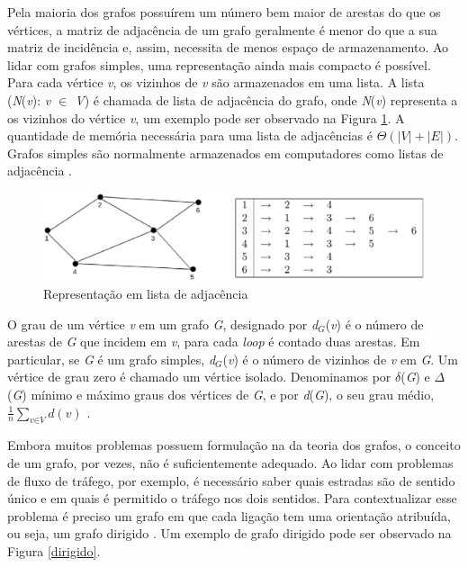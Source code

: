 Pela maioria dos grafos possuírem um número bem maior de arestas do que os vértices, a matriz de adjacência de um grafo geralmente é menor do que a sua matriz de incidência e, assim, necessita de menos espaço de armazenamento. Ao lidar com grafos simples, uma representação ainda mais compacto é possível. Para cada vértice \textit{v}, os vizinhos de \textit{v} são armazenados em uma lista. A lista (\textit{N}(\textit{v}): \textit{v $\in$ V}) é chamada de lista de adjacência do grafo, onde \textit{N}(\textit{v}) representa a os vizinhos do vértice \textit{v}, um exemplo pode ser observado na Figura \ref{lista_adjacencia}. A quantidade de memória necessária para uma lista de adjacências é $\Theta(|\textit{V}| + |\textit{E}|)$. Grafos simples são normalmente armazenados em computadores como listas de adjacência \cite{Costa:2011}.

\begin{figure}[!h]
	\centering
	\includegraphics[scale=0.5]{figuras/capitulo2/lista_adjacencia.eps}
	\caption{Representação em lista de adjacência}
	\label{lista_adjacencia}
\end{figure}

O grau de um vértice \textit{v} em um grafo \textit{G}, designado por \textit{d$_G$}(\textit{v}) é o número de arestas de \textit{G} que incidem em \textit{v}, para cada \textit{loop} é contado duas arestas. Em particular, se \textit{G} é um grafo simples, \textit{d$_G$}(\textit{v}) é o número de vizinhos de \textit{v} em \textit{G}. Um vértice de grau zero é chamado um vértice isolado. Denominamos por $\delta$(\textit{G}) e $\Delta$(\textit{G}) mínimo e máximo graus dos vértices de \textit{G}, e por \textit{d}(\textit{G}), o seu grau médio, $\frac{1}{n}\sum_{\textit{v}\in\textit{V}} \textit{d}(\textit{v})$ \cite{Diestel:1997}.

Embora muitos problemas possuem formulação na da teoria dos grafos, o conceito de um grafo, por vezes, não é suficientemente adequado. Ao lidar com problemas de fluxo de tráfego, por exemplo, é necessário saber quais estradas são de sentido único e em quais é permitido o tráfego nos dois sentidos. Para contextualizar esse problema é preciso um grafo em que cada ligação tem uma orientação atribuída, ou seja, um grafo dirigido \cite{Bondy:2007}. Um exemplo de grafo dirigido pode ser observado na Figura \ref{dirigido}.

